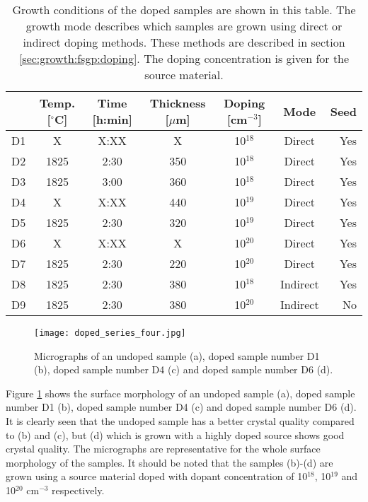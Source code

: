 \begin{table}[h]
\caption{Growth conditions of the doped samples are shown in this table. The growth mode describes which samples are grown using direct or indirect doping methods. These methods are described in section \ref{sec:growth:fsgp:doping}. The doping concentration is given for the source material.} 
\label{tab:doped_samples}
\begin{center}
\begin{tabular}{l c c c c c r}
  \hline                       
  \hline       
  \vspace{1mm}
   & \small{Temp. [$^\circ$C]} & \small{Time [h:min]} & \small{Thickness [$\mu$m]} & \small{Doping [cm$^{-3}$]} & Mode & Seed\\
    \hline
  D1 & X & X:XX & X & 10$^{18}$&Direct & Yes\\ %
  D2 & 1825 & 2:30 & 350 & 10$^{18}$&Direct & Yes\\ %
  D3 & 1825 & 3:00 & 360 & 10$^{18}$&Direct & Yes\\	%
  D4 & X & X:XX & 440 & 10$^{19}$&Direct & Yes\\ %
  D5 & 1825 & 2:30 & 320 & 10$^{19}$&Direct & Yes\\ %
  D6 & X & X:XX & X & 10$^{20}$&Direct & Yes\\%
  D7 & 1825 & 2:30 & 220 & 10$^{20}$&Direct & Yes\\%
  D8 & 1825 & 2:30 & 380 & 10$^{18}$&Indirect & Yes\\%
  D9 & 1825 & 2:30 & 380 & 10$^{20}$&Indirect & No\\%
  
  \hline  
\end{tabular}
\end{center}
\end{table}


\begin{figure}[h]
\begin{center}
\texttt{[image: doped\_series\_four.jpg]}
\caption{Micrographs of an undoped sample (a), doped sample number D1 (b), doped sample number D4 (c) and doped sample number D6 (d).
\label{fig:B_doped_micrographs1}}
\end{center}
\end{figure}

Figure \ref{fig:B_doped_micrographs1} shows the surface morphology of an undoped sample (a), doped sample number D1 (b), doped sample number D4 (c) and doped sample number D6 (d). It is clearly seen that the undoped sample has a better crystal quality compared to (b) and (c), but (d) which is grown with a highly doped source shows good crystal quality. The micrographs are representative for the whole surface morphology of the samples. It should be noted that the samples (b)-(d)   are grown using a source material doped with dopant concentration of 10$^{18}$, 10$^{19}$ and 10$^{20}$ cm$^{-3}$ respectively.


